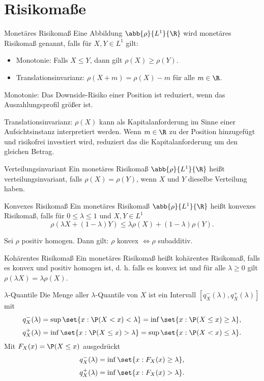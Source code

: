 \section{Risikomaße}

\begin{karte}{Monetäres Risikomaß}
Eine Abbildung \(\abb{\rho}{L^1}{\R}\) wird monetäres Risikomaß genannt, falls für 
\(X,Y\in L^1\) gilt: 
\begin{itemize}
    \item Monotonie: Falls \(X\leq Y\), dann gilt \(\rho(X) \geq \rho(Y)\).
    \item Translationsinvarianz: \(\rho(X+m) = \rho(X) - m\) für alle \(m\in \R\).
\end{itemize}

Monotonie: Das Downside-Risiko einer Position ist reduziert, wenn das Auszahlungsprofil größer ist.

Translationsinvarianz: \(\rho(X)\) kann als Kapitalanforderung im Sinne einer Aufsichtsinstanz interpretiert 
werden. Wenn \(m\in\R\) zu der Position hinzugefügt und risikofrei investiert wird, reduziert das die 
Kapitalanforderung um den gleichen Betrag.
\end{karte}

\begin{karte}{Verteilungsinvariant}
Ein monetäres Risikomaß \(\abb{\rho}{L^1}{\R}\) heißt verteilungsinvariant, falls \(\rho(X) = \rho(Y)\), 
wenn \(X\) und \(Y\) dieselbe Verteilung haben. 
\end{karte}

\begin{karte}{Konvexes Risikomaß}
Ein monetäres Risikomaß \(\abb{\rho}{L^1}{\R}\) heißt konvexes Risikomaß, falls für 
\(0 \leq \lambda \leq 1\) und \(X,Y\in L^1\) 
\[ \rho(\lambda X + (1-\lambda) Y) \leq \lambda \rho(X) + (1-\lambda) \rho(Y). \]

Sei \(\rho\) positiv homogen. Dann gilt: \(\rho\) konvex \(\Leftrightarrow \rho\) subadditiv.
\end{karte}

\begin{karte}{Kohärentes Risikomaß}
Ein monetäres Risikomaß heißt kohärentes Risikomaß, falls es konvex und 
positiv homogen ist, d. h. falls es konvex ist und für alle \(\lambda \geq 0\) gilt 
\(\rho(\lambda X) = \lambda \rho(X)\).
\end{karte}

\begin{karte}{\(\lambda\)-Quantile}
Die Menge aller \(\lambda\)-Quantile von \(X\) ist ein Intervall \([q_X^-(\lambda), q_X^+(\lambda)]\) 
mit 
\[ q_X^-(\lambda) = \sup \set{x : \P(X<x) < \lambda} =\inf \set{x: \P(X\leq x) \geq \lambda}, \]
\[ q_X^+(\lambda) = \inf \set{x: \P(X\leq x) > \lambda} = \sup \set{x: \P(X<x) \leq \lambda}.\]
Mit \(F_X(x) = \P(X \leq x)\) ausgedrückt
\[ q_X^-(\lambda) = \inf \set{x: F_X(x) \geq \lambda}, \]
\[ q_X^+(\lambda) = \inf \set{x: F_X(x) > \lambda}. \]
\end{karte}

